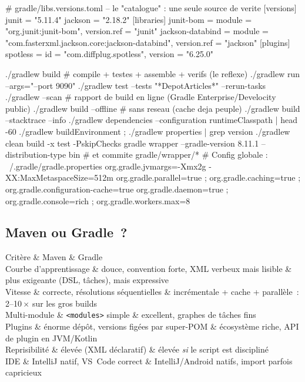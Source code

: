 \begin{codeconf}
# gradle/libs.versions.toml -- le "catalogue" : une seule source de verite
[versions]
junit = "5.11.4"
jackson = "2.18.2"
[libraries]
junit-bom = { module = "org.junit:junit-bom", version.ref = "junit" }
jackson-databind = { module = "com.fasterxml.jackson.core:jackson-databind", version.ref = "jackson" }
[plugins]
spotless = { id = "com.diffplug.spotless", version = "6.25.0" }
\end{codeconf}

\begin{terminal}
./gradlew build                # compile + testes + assemble + verifs (le reflexe)
./gradlew run --args="--port 9090"
./gradlew test --tests "*DepotArticles*" --rerun-tasks
./gradlew --scan               # rapport de build en ligne (Gradle Enterprise/Develocity public)
./gradlew build --offline      # sans reseau (cache deja peuple)
./gradlew build --stacktrace --info
./gradlew dependencies --configuration runtimeClasspath | head -60
./gradlew buildEnvironment ; ./gradlew properties | grep version
./gradlew clean build -x test -PskipChecks
gradle wrapper --gradle-version 8.11.1 --distribution-type bin   # et commite gradle/wrapper/*
# Config globale : ~/.gradle/gradle.properties
org.gradle.jvmargs=-Xmx2g -XX:MaxMetaspaceSize=512m
org.gradle.parallel=true ; org.gradle.caching=true ; org.gradle.configuration-cache=true
org.gradle.daemon=true ; org.gradle.console=rich ; org.gradle.workers.max=8
\end{terminal}

\subsection{Maven ou Gradle~?}

\begin{tablez}
  \headrow Crit\`ere \& Maven \& Gradle \\
  \midrule
  Courbe d'apprentissage \& douce, convention forte, XML verbeux mais lisible \& plus exigeante (DSL, t\^aches), mais expressive \\
  Vitesse \& correcte, r\'esolutions s\'equentielles \& incr\'ementale + cache + parall\`ele~: 2--10\,$\times$ sur les gros builds \\
  Multi-module \& \verb|<modules>| simple \& excellent, graphes de t\^aches fins \\
  Plugins \& \'enorme d\'ep\^ot, versions fig\'ees par super-POM \& \'ecosyst\`eme riche, API de plugin en JVM/Kotlin \\
  Reprisibilit\'e \& \'elev\'ee (XML d\'eclaratif) \& \'elev\'ee \emph{si} le script est disciplin\'e \\
  IDE \& IntelliJ natif, VS~Code correct \& IntelliJ/Android natifs, import parfois capricieux \\
\end{tablez}

